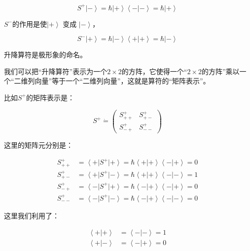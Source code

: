 \begin{equation}
S^+ \left| - \right\rangle = \hbar  \left| + \right\rangle \left\langle -  | -   \right\rangle = \hbar \left| + \right\rangle~
\end{equation}

$S^-$的作用是使$\left| + \right\rangle$ 变成 $\left| - \right\rangle$，

\begin{equation}
S^- \left| + \right\rangle = \hbar  \left| - \right\rangle \left\langle +  | +   \right\rangle = \hbar \left| - \right\rangle~
\end{equation}

升降算符是极形象的命名。

我们可以把“升降算符”表示为一个$2 \times 2$的方阵，它使得一个“$2 \times 2$的方阵”乘以一个“二维列向量”等于一个“二维列向量”，这就是算符的“矩阵表示”。

比如$S^+$的矩阵表示是：

\begin{equation}
S^+ \dot = \left(  \begin{array}{ccc}  S^+_{++} &  S^+_{+-} \\  S^+_{-+} & S^+_{--}  \end{array} \right)~
\end{equation}

这里的矩阵元分别是：

\begin{align}
S^+_{++} &= \left\langle + \right| S^+ \left| + \right\rangle = \hbar \left\langle + | +  \right\rangle  \left\langle  - | + \right\rangle = 0 \\
S^+_{+-} &= \left\langle + \right| S^+ \left| - \right\rangle = \hbar \left\langle + | + \right\rangle  \left\langle - | - \right\rangle = 1 \\
S^+_{-+} &= \left\langle - \right| S^+ \left| + \right\rangle = \hbar \left\langle - | + \right\rangle \left\langle - | + \right\rangle = 0 \\
S^+_{--} &= \left\langle - \right| S^+ \left| - \right\rangle = \hbar \left\langle - | + \right\rangle \left\langle - | - \right\rangle = 0~
\end{align}

这里我们利用了：

\begin{align}
\left\langle + | + \right\rangle  &=  \left\langle - | - \right\rangle = 1 \\
\left\langle + | - \right\rangle  &=  \left\langle - | + \right\rangle = 0~
\end{align}

